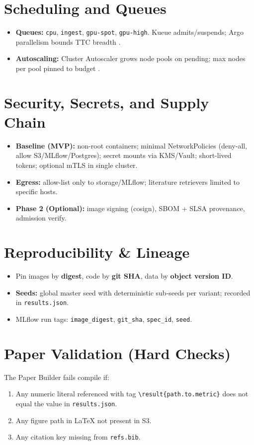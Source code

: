 \section{Scheduling and Queues}
\begin{itemize}[leftmargin=1.4em]
\item \textbf{Queues:} \texttt{cpu}, \texttt{ingest}, \texttt{gpu-spot}, \texttt{gpu-high}. Kueue admits/suspends; Argo parallelism bounds TTC breadth \cite{kueueDocs,argoDocs}.
\item \textbf{Autoscaling:} Cluster Autoscaler grows node pools on pending; max nodes per pool pinned to budget \cite{k8sAutoscaler}.
\end{itemize}

\section{Security, Secrets, and Supply Chain}
\begin{itemize}[leftmargin=1.4em]
\item \textbf{Baseline (MVP):} non-root containers; minimal NetworkPolicies (deny-all, allow S3/MLflow/Postgres); secret mounts via KMS/Vault; short-lived tokens; optional mTLS in single cluster.
\item \textbf{Egress:} allow-list only to storage/MLflow; literature retrievers limited to specific hosts.
\item \textbf{Phase 2 (Optional):} image signing (cosign), SBOM + SLSA provenance, admission verify.
\end{itemize}

\section{Reproducibility \& Lineage}
\begin{itemize}[leftmargin=1.4em]
\item Pin images by \textbf{digest}, code by \textbf{git SHA}, data by \textbf{object version ID}.
\item \textbf{Seeds:} global master seed with deterministic sub‑seeds per variant; recorded in \texttt{results.json}.
\item MLflow run tags: \texttt{image\_digest}, \texttt{git\_sha}, \texttt{spec\_id}, \texttt{seed}.
\end{itemize}

\section{Paper Validation (Hard Checks)}
The Paper Builder fails compile if:
\begin{enumerate}[leftmargin=1.4em]
\item Any numeric literal referenced with tag \verb|\result{path.to.metric}| does not equal the value in \texttt{results.json}.
\item Any figure path in LaTeX not present in S3.
\item Any citation key missing from \texttt{refs.bib}.
\end{enumerate}

